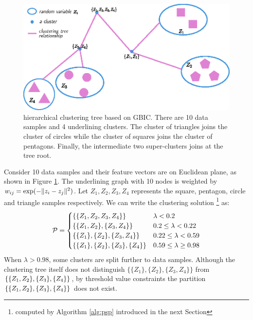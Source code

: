 \begin{example}
\begin{figure}
	\centering
	\includegraphics[width=\textwidth]{GBIC.eps}
	\caption{hierarchical clustering tree based on GBIC. There are 10 data samples and 4 underlining clusters. The cluster of triangles joins the cluster of circles while the cluster of squares joins the cluster of pentagons. Finally, the intermediate two super-clusters joins at the tree root.}\label{fig:ta}
\end{figure}
Consider 10 data samples and their feature vectors are on Euclidean plane, as shown in Figure \ref{fig:ta}. The underlining graph with 10 nodes is weighted  by $w_{ij} = \exp(-\norm{z_i - z_j}^2)$. Let $Z_1, Z_2, Z_3, Z_4$ represents the square, pentagon, circle and triangle samples respectively. We can write the clustering solution \footnote{computed by Algorithm \ref{alg:psp} introduced in the next Section} as:
\begin{equation*}
\P = 
\begin{cases}
\{\{Z_1,Z_2,Z_3,Z_4\}\} & \lambda < 0.2 \\
\{\{Z_1,Z_2\},\{Z_3,Z_4\}\} & 0.2 \leq \lambda < 0.22 \\
\{\{Z_1\},\{Z_2\},\{Z_3,Z_4\}\} & 0.22 \leq \lambda < 0.59\\
\{\{Z_1\},\{Z_2\},\{Z_3\},\{Z_4\}\} & 0.59 \leq \lambda \geq 0.98
\end{cases}
\end{equation*}
When $\lambda > 0.98$, some clusters are split further to data samples.
Although the clustering tree itself does not distinguish
$\{\{Z_1\},\{Z_2\},\{Z_3,Z_4\}\}$ from $\{\{Z_1,Z_2\},\linebreak[2] \{Z_3\}, \{Z_4\}\}$,
by threshold value constraints the partition $\{\{Z_1,Z_2\} \linebreak[2] ,\{Z_3\}, \{Z_4\}\}$ does not exist.
\end{example}

